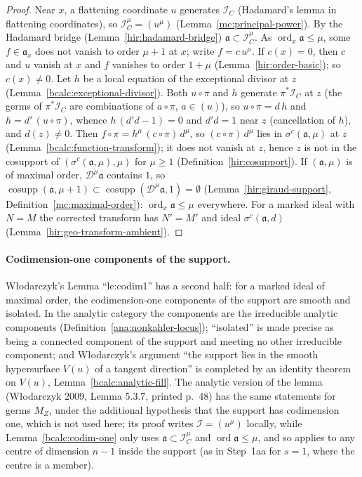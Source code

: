 \begin{proof}
\mixedleanok
Near \(x\), a flattening coordinate \(u\) generates \(\mathcal I_C\) (Hadamard's lemma in flattening coordinates), so \(\mathcal I_C^\mu=(u^\mu)\)
(Lemma~\ref{mc:principal-power}). By the Hadamard bridge (Lemma~\ref{hir:hadamard-bridge}) \(\mathfrak a\subset\mathcal I_C^\mu\). As
\(\operatorname{ord}_x\mathfrak a\le\mu\), some \(f\in\mathfrak a_x\) does not vanish to order \(\mu+1\) at \(x\); write \(f=c\,u^\mu\). If \(c(x)=0\), then
\(c\) and \(u\) vanish at \(x\) and \(f\) vanishes to order \(1+\mu\) (Lemma~\ref{hir:order-basic}); so \(c(x)\neq0\). Let \(h\) be a local equation of the
exceptional divisor at \(z\) (Lemma~\ref{bcalc:exceptional-divisor}). Both \(u\circ\pi\) and \(h\) generate \(\pi^*\mathcal I_C\) at \(z\) (the germs of
\(\pi^*\mathcal I_C\) are combinations of \(a\circ\pi\), \(a\in(u)\)), so \(u\circ\pi=d\,h\) and \(h=d'\,(u\circ\pi)\), whence \(h\,(d'd-1)=0\) and
\(d'd=1\) near \(z\) (cancellation of \(h\)), and \(d(z)\neq0\). Then \(f\circ\pi=h^\mu\,(c\circ\pi)\,d^\mu\), so \((c\circ\pi)\,d^\mu\) lies in
\(\sigma^{c}(\mathfrak a,\mu)\) at \(z\) (Lemma~\ref{bcalc:function-transform}); it does not vanish at \(z\), hence \(z\) is not in the cosupport of
\((\sigma^{c}(\mathfrak a,\mu),\mu)\) for \(\mu\ge1\) (Definition~\ref{hir:cosupport}). If \((\mathfrak a,\mu)\) is of maximal order, \(\mathcal D^\mu\mathfrak a\)
contains \(1\), so \(\operatorname{cosupp}(\mathfrak a,\mu+1)\subset\operatorname{cosupp}(\mathcal D^\mu\mathfrak a,1)=\emptyset\) (Lemma~\ref{hir:giraud-support},
Definition~\ref{mc:maximal-order}): \(\operatorname{ord}_x\mathfrak a\le\mu\) everywhere. For a marked ideal with \(N=M\) the corrected transform has
\(N'=M'\) and ideal \(\sigma^{c}(\mathfrak a,d)\) (Lemma~\ref{hir:geo-transform-ambient}).
\end{proof}

\paragraph{Codimension-one components of the support.} Włodarczyk's Lemma ``le:codim1'' has a second half: for a marked ideal of maximal order,
the codimension-one components of the support are smooth and isolated. In the analytic category the components are the irreducible analytic
components (Definition~\ref{ana:nonkahler-locus}); ``isolated'' is made precise as being a connected component of the support and meeting no
other irreducible component; and Włodarczyk's argument ``the support lies in the smooth hypersurface \(V(u)\) of a tangent direction'' is completed
by an identity theorem on \(V(u)\), Lemma~\ref{bcalc:analytic-fill}. The analytic version of the lemma (Włodarczyk 2009, Lemma 5.3.7, printed p.~48) has the same statements for germs \(M_Z\), under the
additional hypothesis that the support has codimension one, which is not used here; its proof writes \(\mathcal I=(u^\mu)\) locally, while
Lemma~\ref{bcalc:codim-one} only uses \(\mathfrak a\subset\mathcal I_C^\mu\) and \(\operatorname{ord}\mathfrak a\le\mu\), and so applies to any centre of
dimension \(n-1\) inside the support (as in Step~1aa for \(s=1\), where the centre is a member).

